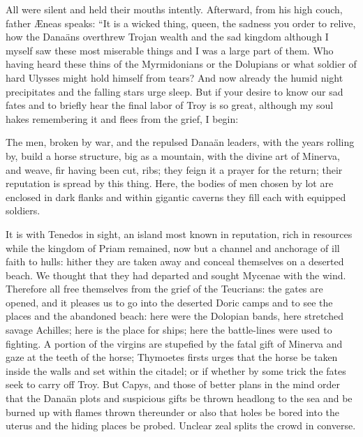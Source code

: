 All were silent and held their mouths intently.
Afterward, from his high couch, father {\AE}neas speaks:
``It is a wicked thing, queen, the sadness you order to relive,
how the Dana\"ans overthrew Trojan wealth and the sad kingdom
although I myself saw these most miserable things
and I was a large part of them.  Who having heard these thins
of the Myrmidonians or the Dolupians or what soldier of
hard Ulysses might hold himself from tears?  And now already
the humid night precipitates and the falling stars
urge sleep.
But if your desire to know our sad fates and
to briefly hear the final labor of Troy is so great,
although my soul hakes remembering it and
flees from the grief, I begin:

The men, broken by war, and the repulsed Dana\"an leaders,
with the years rolling by, build
a horse structure, big as a mountain, with the divine
art of Minerva, and weave, fir having been cut, ribs;
they feign it a prayer for the return; their reputation
is spread by this thing.
Here, the bodies of men chosen by lot are enclosed
in dark flanks and within
gigantic caverns they fill each with equipped soldiers.

It is with Tenedos in sight, an island most known in reputation,
rich in resources while the kingdom of Priam remained,
now but a channel and anchorage of ill faith to hulls:
hither they are taken away and conceal themselves on a
deserted beach.  We thought that they
had departed and sought Mycenae with the wind.
Therefore all free themselves from the grief of the Teucrians:
the gates are opened, and it pleases us to go into
the deserted Doric camps and to see the places and
the abandoned beach:
here were the Dolopian bands, here stretched savage Achilles;
here is the place for ships; here the battle-lines were used to fighting.
A portion of the virgins are stupefied by the fatal gift of Minerva and
gaze at the teeth of the horse; Thymoetes firsts urges
that the horse be taken inside the walls and set within the citadel;
or if whether by some trick the fates seek to carry off Troy.
But Capys, and those of better plans in the mind order that
the Dana\"an plots and suspicious gifts be thrown headlong to the sea and
be burned up with flames thrown thereunder or also that holes
be bored into the uterus and the hiding places be probed.
Unclear zeal splits the crowd in converse.

